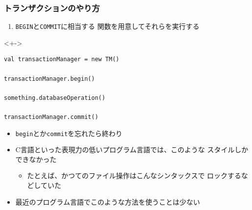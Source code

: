 \begin{frame}[fragile]
  \frametitle{トランザクションのやり方}

  \pause
  \begin{enumerate}
    \item<+-> \texttt{BEGIN}と\texttt{COMMIT}に相当する
    関数を用意してそれらを実行する
  \end{enumerate}

  \begin{uncoverenv}<+->
\begin{lstlisting}[style=scala]
val transactionManager = new TM()

transactionManager.begin()

something.databaseOperation()

transactionManager.commit()
\end{lstlisting}
  \end{uncoverenv}

  \begin{itemize}
    \item<+-> \lstinline|begin|とか\lstinline|commit|を忘れたら終わり

    \item<+-> C言語といった表現力の低いプログラム言語では、このような
    スタイルしかできなかった
    \begin{itemize}
      \item<+-> たとえば、かつてのファイル操作はこんなシンタックスで
      ロックするなどしていた
    \end{itemize}

    \item<+-> 最近のプログラム言語でこのような方法を使うことは少ない
  \end{itemize}
\end{frame}

